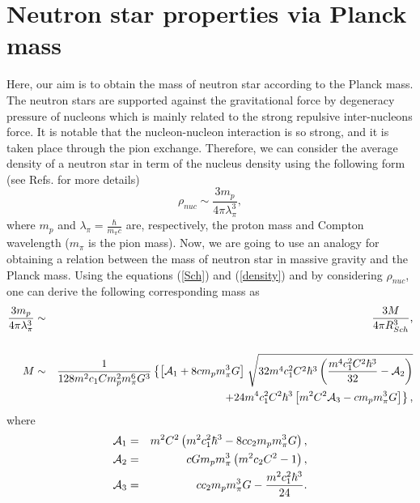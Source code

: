 \documentclass[aps]{revtex4}
\begin{document}
\section{Neutron star properties via Planck mass \label{Planck}}

Here, our aim is to obtain the mass of neutron star according to the Planck
mass. The neutron stars are supported against the gravitational force by
degeneracy pressure of nucleons which is mainly related to the strong
repulsive inter-nucleons force. It is notable that the nucleon-nucleon
interaction is so strong, and it is taken place through the pion exchange.
Therefore, we can consider the average density of a neutron star in term of
the nucleus density using the following form (see Refs. \cite%
{HendiBEP,Burrows} for more details)
\begin{equation}
\rho _{nuc}\sim \frac{3m_{p}}{4\pi \lambda _{\pi }^{3}},
\end{equation}%
where $m_{p}$ and $\lambda _{\pi }=\frac{\hbar }{m_{\pi }c}$ are,
respectively, the proton mass and Compton wavelength ($m_{\pi }$ is the pion
mass). Now, we are going to use an analogy for obtaining a relation between
the mass of neutron star in massive gravity and the Planck mass. Using the
equations (\ref{Sch}) and (\ref{density}) and by considering $\rho _{nuc}$,
one can derive the following corresponding mass as%
\begin{eqnarray}
\frac{3m_{p}}{4\pi \lambda _{\pi }^{3}} &\sim &\frac{3M}{4\pi R_{Sch}^{3}},
\nonumber \\
&&  \nonumber \\
M &\sim &\frac{1}{128m^{2}c_{1}Cm_{p}^{2}m_{\pi }^{6}G^{3}}\left\{ \left[
\mathcal{A}_{1}+8cm_{p}m_{\pi }^{3}G\right] \right. \sqrt{%
32m^{4}c_{1}^{2}C^{2}\hbar ^{3}\left( \frac{m^{4}c_{1}^{2}C^{2}\hbar ^{3}}{32%
}-\mathcal{A}_{2}\right) }  \nonumber \\
&&\left. +24m^{4}c_{1}^{2}C^{2}\hbar ^{3}\left[ m^{2}C^{2}\mathcal{A}%
_{3}-cm_{p}m_{\pi }^{3}G\right] \right\} ,  \label{PlackI}
\end{eqnarray}%
where%
\begin{eqnarray*}
\mathcal{A}_{1} &=&m^{2}C^{2}\left( m^{2}c_{1}^{2}\hbar
^{3}-8cc_{2}m_{p}m_{\pi }^{3}G\right) , \\
\mathcal{A}_{2} &=&cGm_{p}m_{\pi }^{3}\left( m^{2}c_{2}C^{2}-1\right) , \\
\mathcal{A}_{3} &=&cc_{2}m_{p}m_{\pi }^{3}G-\frac{m^{2}c_{1}^{2}\hbar ^{3}}{%
24}.
\end{eqnarray*}
\end{document}
